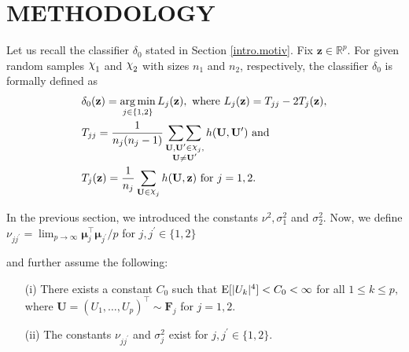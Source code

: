 \documentclass[twoside]{article}
\newcommand{\bX}{\mathbf{X}}
\newcommand{\bY}{\mathbf{Y}}
\newcommand{\bZ}{\mathbf{Z}}
\newcommand{\bF}{\mathbf{F}}
\newcommand{\bU}{\mathbf{U}}
\newcommand{\bz}{\mathbf{z}}
\newcommand{\bmu}{\boldsymbol{\mu}}
\newcommand{\0}{\mathbf{0}}
\newcommand{\1}{\mathbf{1}}
\DeclareRobustCommand{\rchi}{{\mathpalette\irchi\relax}}
\newcommand{\irchi}[2]{\raisebox{\depth}{$#1\chi$}} %
\newcommand{\argmin}{\operatornamewithlimits{arg\,min}}
\numberwithin{equation}{section}
\begin{document}
\section{METHODOLOGY}\label{method}

Let us recall the classifier $\delta_0$ stated in Section \ref{intro.motiv}. Fix $\bz\in\mathbb{R}^p.$ For given random samples $\rchi_1$ and $\rchi_2$ with sizes $n_1$ and $n_2$, respectively, the classifier $\delta_0$ is formally defined as
\begin{align}\label{d0def}
&\delta_0(\bz)=\argmin\limits_{j\in\{1,2\}} L_{j}(\bz),\text{ where }L_{j}(\bz) = T_{jj} - 2T_{j}(\bz),\nonumber\\
&T_{jj}  = \frac{1}{{n_j(n_j-1)}}\mathop{\sum\sum}\limits_{\substack{\bU,\bU^\prime\in\rchi_j,\\\bU\neq\bU^\prime}} h(\bU,\bU^\prime) \text{ and}\nonumber \\
&T_{j}(\bz) =\frac{1}{n_j}\sum\limits_{\bU\in\rchi_j}h(\bU,\bz)\text{ for } j=1,2.
\end{align}

In the previous section, we introduced the constants $\nu^2,\sigma_1^2$ and $\sigma_2^2$. Now, we define $\nu_{jj^\prime} = \lim_{p\to\infty}\bmu_j^\top\bmu_{j^\prime}/p$ for $j,j^\prime\in \{1,2\}$

and further assume the following:
\begin{enumerate}
\item[(i)] There exists a constant $C_0$ such that ${\rm E}[|U_k|^4]<C_0<\infty$ for all $1\le k\le p,$ where $\bU=(U_1,\ldots,U_p)^\top\sim\bF_j$ for $j=1,2$.
\item[(ii)] The constants $\nu_{jj^\prime}$ and $\sigma^2_j$ exist for $ j,j^\prime\in\{1,2\}$.
\end{enumerate}
\end{document}
